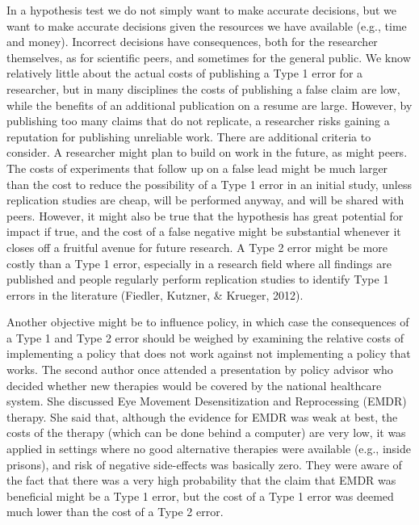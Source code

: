 \documentclass[
  english,
  ,man, a4paper,floatsintext]{apa6}
\begin{document}
In a hypothesis test we do not simply want to make accurate decisions, but we want to make accurate decisions given the resources we have available (e.g., time and money). Incorrect decisions have consequences, both for the researcher themselves, as for scientific peers, and sometimes for the general public. We know relatively little about the actual costs of publishing a Type 1 error for a researcher, but in many disciplines the costs of publishing a false claim are low, while the benefits of an additional publication on a resume are large. However, by publishing too many claims that do not replicate, a researcher risks gaining a reputation for publishing unreliable work. There are additional criteria to consider. A researcher might plan to build on work in the future, as might peers. The costs of experiments that follow up on a false lead might be much larger than the cost to reduce the possibility of a Type 1 error in an initial study, unless replication studies are cheap, will be performed anyway, and will be shared with peers. However, it might also be true that the hypothesis has great potential for impact if true, and the cost of a false negative might be substantial whenever it closes off a fruitful avenue for future research. A Type 2 error might be more costly than a Type 1 error, especially in a research field where all findings are published and people regularly perform replication studies to identify Type 1 errors in the literature (Fiedler, Kutzner, \& Krueger, 2012).

Another objective might be to influence policy, in which case the consequences of a Type 1 and Type 2 error should be weighed by examining the relative costs of implementing a policy that does not work against not implementing a policy that works. The second author once attended a presentation by policy advisor who decided whether new therapies would be covered by the national healthcare system. She discussed Eye Movement Desensitization and Reprocessing (EMDR) therapy. She said that, although the evidence for EMDR was weak at best, the costs of the therapy (which can be done behind a computer) are very low, it was applied in settings where no good alternative therapies were available (e.g., inside prisons), and risk of negative side-effects was basically zero. They were aware of the fact that there was a very high probability that the claim that EMDR was beneficial might be a Type 1 error, but the cost of a Type 1 error was deemed much lower than the cost of a Type 2 error.
\end{document}
